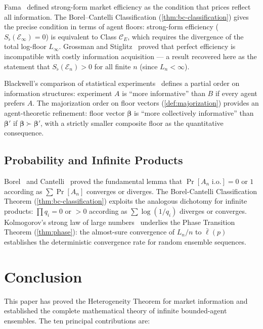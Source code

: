 \documentclass[twocolumn,11pt,a4paper]{article}
\theoremstyle{remark}
\newcommand{\Sflat}{S_{\flat}}
\newcommand{\Ens}{\mathcal{E}}
\newcommand{\ClassE}{\mathcal{C}_E}       %
\newcommand{\logfl}{\ell}                 %
\newcommand{\Logfl}{L}                    %
\begin{document}
Fama~\cite{fama1970} defined strong-form market efficiency as the condition
that prices reflect all information.  The Borel--Cantelli Classification
(\cref{thm:bc-classification}) gives the precise condition in terms of agent
floors: strong-form efficiency ($\Sflat(\Ens_\infty) = 0$) is equivalent to
Class $\ClassE$, which requires the divergence of the total log-floor
$\Logfl_\infty$.  Grossman and Stiglitz~\cite{grossmanstiglitz1980}
proved that perfect efficiency is incompatible with costly information
acquisition — a result recovered here as the statement that
$\Sflat(\Ens_n) > 0$ for all finite $n$ (since $\Logfl_n < \infty$).

Blackwell's comparison of statistical experiments~\cite{blackwell1953}
defines a partial order on information structures: experiment $A$ is
``more informative'' than $B$ if every agent prefers $A$.  The majorization
order on floor vectors (\cref{def:majorization}) provides an agent-theoretic
refinement: floor vector $\boldsymbol\beta$ is ``more collectively informative''
than $\boldsymbol\beta'$ if $\boldsymbol\beta \succ \boldsymbol\beta'$, with
a strictly smaller composite floor as the quantitative consequence.

\subsection{Probability and Infinite Products}
\label{sec:lit:prob}

Borel~\cite{borel1909} and Cantelli~\cite{cantelli1917} proved the
fundamental lemma that $\Pr[A_n \text{ i.o.}] = 0$ or $1$ according as
$\sum \Pr[A_n]$ converges or diverges.  The Borel-Cantelli Classification
Theorem (\cref{thm:bc-classification}) exploits the analogous dichotomy for
infinite products: $\prod q_i = 0$ or $> 0$ according as $\sum \log(1/q_i)$
diverges or converges.  Kolmogorov's strong law of large numbers~\cite{kolmogorov1933}
underlies the Phase Transition Theorem (\cref{thm:phase}): the almost-sure
convergence of $\Logfl_n/n$ to $\bar\logfl(p)$ establishes the deterministic
convergence rate for random ensemble sequences.

\section{Conclusion}
\label{sec:conclusion}

This paper has proved the Heterogeneity Theorem for market information and
established the complete mathematical theory of infinite bounded-agent ensembles.
The ten principal contributions are:
\end{document}

